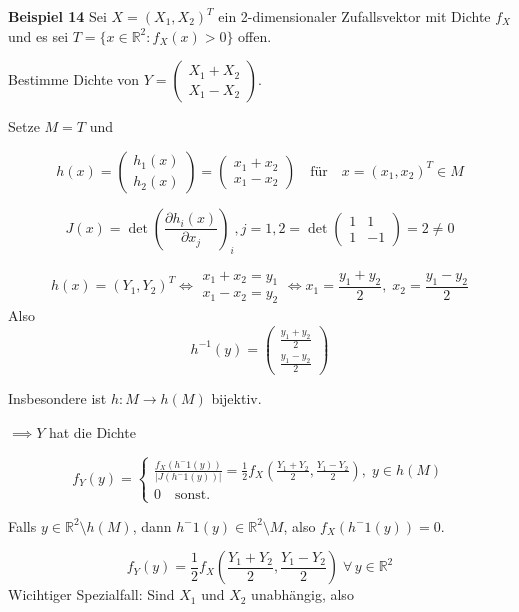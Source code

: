 \documentclass[12pt, a4paper]{article}
\theoremstyle{empty}
\newcommand{\R}{\mathbb{R}}
\newcommand{\1}{\mathds{1}}
\providecommand{\abs}[1]{\lvert#1\rvert}
\providecommand{\mtext}[1]{\quad \text{#1} \quad}
\begin{document}
\textbf{Beispiel 14} Sei $X = (X_1, X_2)^T$ ein 2-dimensionaler Zufallsvektor mit Dichte $f_X$ und es sei $T = \{ x\in\R^2 : f_X (x) > 0 \}$ offen.

Bestimme Dichte von $Y = \begin{pmatrix} X_1 + X_2 \\X_1 - X_2 \end{pmatrix}$.

Setze $M=T$ und 

\[ h(x) = \begin{pmatrix} h_1(x) \\ h_2 (x)   \end{pmatrix} = \begin{pmatrix} x_1 + x_2 \\ x_1 - x_2 \end{pmatrix} \mtext{für} x = (x_1, x_2)^T \in M \]

\[ J(x) = \det(  \frac{ \partial h_i (x) }{\partial x_j}    )_i,j = 1,2  = \det \begin{pmatrix} 1 & 1 \\ 1 & -1 \end{pmatrix}  = 2 \neq 0    \]

\[  h(x) = (Y_1, Y_2)^T  \iff \begin{matrix} x_1 + x_2 = y_1 \\ x_1 - x_2 = y_2 \end{matrix}  \iff x_1 = \frac{y_1 + y_2}{2}, \; x_2 = \frac{y_1 - y_2}{2}   \]
Also 
\[  h^{-1}(y) = \begin{pmatrix} \frac{y_1 + y_2}{2} \\ \frac{y_1 - y_2}{2} \end{pmatrix}     \]

Insbesondere ist $h:M \to h(M)$ bijektiv.

$\implies Y$ hat die Dichte

\[ f_Y (y) = \begin{cases}  \frac{f_X (h^-1 (y))}{\abs{J(h^-1 (y))}} = \frac{1}{2}f_X (\frac{Y_1 + Y_2}{2}, \frac{Y_1 - Y_2}{2}), \; y \in h(M) \\ 0 \mtext{sonst.}  \end{cases}      \]

Falls $y \in \R^2 \setminus h(M)$, dann $h^-1 (y) \in \R^2 \setminus M$, also $f_X (h^-1 (y)) = 0$.

\[ f_Y (y) = \frac{1}{2} f_X (\frac{Y_1 + Y_2}{2}, \frac{Y_1 - Y_2}{2}) \; \forall \, y \in \R^2      \]
Wicihtiger Spezialfall: Sind $X_1$ und $X_2$ unabhängig, also 
\end{document}
